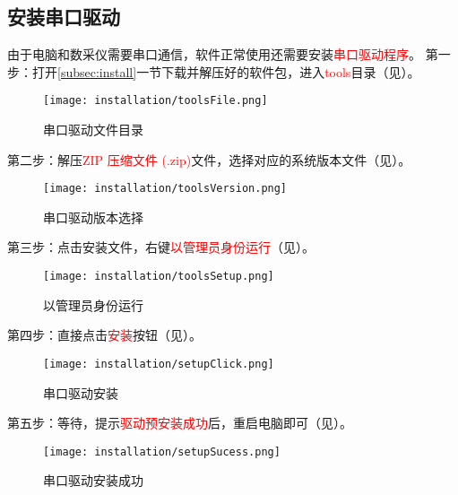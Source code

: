 \subsection{安装串口驱动}
由于电脑和数采仪需要串口通信，软件正常使用还需要安装\textcolor{red}{串口驱动程序}。
第一步：打开\ref{subsec:install}一节下载并解压好的软件包，进入\textcolor{red}{tools}目录（见）。
\begin{figure}[htbp]
    \centering
    \texttt{[image: installation/toolsFile.png]}
    \caption{ 串口驱动文件目录 \label{fig:toolsFile}}
\end{figure}
第二步：解压\textcolor{red}{ZIP 压缩文件 (.zip)}文件，选择对应的系统版本文件（见）。
\begin{figure}[htbp]
    \centering
    \texttt{[image: installation/toolsVersion.png]}
    \caption{ 串口驱动版本选择 \label{fig:toolsVersion}}
\end{figure}
第三步：点击安装文件，右键\textcolor{red}{以管理员身份运行}（见）。
\begin{figure}[htbp]
    \centering
    \texttt{[image: installation/toolsSetup.png]}
    \caption{ 以管理员身份运行 \label{fig:toolsSetup}}
\end{figure}
第四步：直接点击\textcolor{red}{安装}按钮（见）。
\begin{figure}[htbp]
    \centering
    \texttt{[image: installation/setupClick.png]}
    \caption{ 串口驱动安装 \label{fig:setupClick}}
\end{figure}
第五步：等待，提示\textcolor{red}{驱动预安装成功}后，重启电脑即可（见）。
\begin{figure}[htbp]
    \centering
    \texttt{[image: installation/setupSucess.png]}
    \caption{ 串口驱动安装成功 \label{fig:setupSucess}}
\end{figure}
